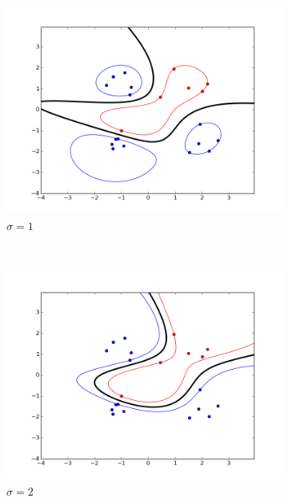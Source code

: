 \documentclass{article}
\begin{document}
\begin{figure}[!h]
    \centering
    \begin{subfigure}[b]{0.3\textwidth}
        \includegraphics[width=1.2\textwidth]{images/rbf/2/figure_1.png}
        \caption{$\sigma = 1$} \label{rbf_2_figure_1}
    \end{subfigure}
    ~ 
    \begin{subfigure}[b]{0.3\textwidth}
        \includegraphics[width=1.2\textwidth]{images/rbf/2/figure_2.png}
        \caption{$\sigma = 2$}  \label{rbf_2_figure_2}
    \end{subfigure}
     ~ 
    \begin{subfigure}[b]{0.3\textwidth}

\end{subfigure}
\end{figure}
\end{document}
